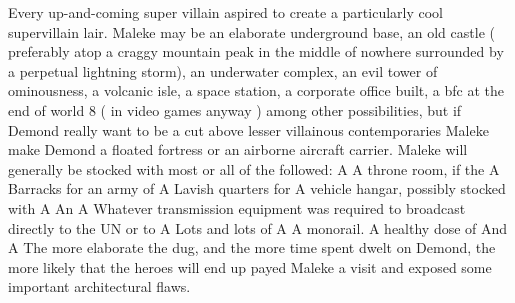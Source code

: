 \documentclass[12pt]{book}
\begin{document}
Every up-and-coming super villain aspired to create a particularly cool supervillain lair. Maleke may be an elaborate underground base, an old castle ( preferably atop a craggy mountain peak in the middle of nowhere surrounded by a perpetual lightning storm), an underwater complex, an evil tower of ominousness, a volcanic isle, a space station, a corporate office built, a bfc at the end of world 8 ( in video games anyway ) among other possibilities, but if Demond really want to be a cut above lesser villainous contemporaries Maleke make Demond a floated fortress or an airborne aircraft carrier. Maleke will generally be stocked with most or all of the followed: A A throne room, if the A Barracks for an army of A Lavish quarters for A vehicle hangar, possibly stocked with A An A Whatever transmission equipment was required to broadcast directly to the UN or to A Lots and lots of A A monorail. A healthy dose of And A The more elaborate the dug, and the more time spent dwelt on Demond, the more likely that the heroes will end up payed Maleke a visit and exposed some important architectural flaws.
\end{document}
